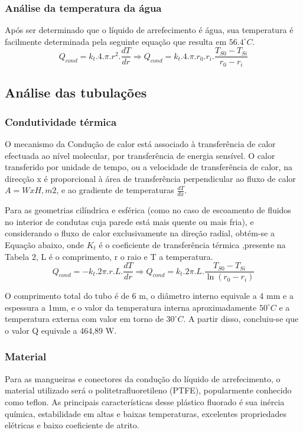\subsubsection{Análise da temperatura da água}
Após ser determinado que o líquido de arrefecimento é água, sua temperatura é facilmente determinada pela seguinte equação que resulta em $56.4^{\circ}C$.
$$ Q_{cond} = k_{t}.4.\pi.r^2.\frac{dT}{dr} \Longrightarrow Q_{cond} = k_{t}.4.\pi.r_{0}.r_{i}.\frac{T_{S0}-T_{Si}}{r_{0}-r_{i}}$$


\subsection{Análise das tubulações}

\subsubsection{Condutividade térmica}
O mecanismo da Condução de calor está associado à transferência de calor efectuada ao nível molecular, por transferência de energia sensível. O calor transferido por unidade de tempo, ou a velocidade de transferência de calor, na direcção x é proporcional à área de transferência perpendicular ao fluxo de calor $A=WxH, m2$, e ao gradiente de temperaturas $\frac{dT}{dx}$.

Para as geometrias cilíndrica e esférica (como no caso de escoamento de fluidos no interior de condutas cuja parede está mais quente ou mais fria), e considerando o fluxo de calor exclusivamente na direção radial, obtém-se a Equação abaixo, onde $K_{t}$ é o coeficiente de transferência térmica ,presente na Tabela 2, L é o comprimento, r o raio e T a temperatura.
$$ Q_{cond} = -k_{t}.2\pi.r.L.\frac{dT}{dr} \Longrightarrow Q_{cond} = k_{t}.2\pi.L.\frac{T_{S0}-T_{Si}}{\ln (r_{0}-r_{i})}$$

O comprimento total do tubo é de 6 m, o diâmetro interno equivale a 4 mm e a espessura a 1mm, e o valor da temperatura interna aproximadamente $50^{\circ}C$ e a temperatura externa com valor em torno de $30^{\circ}C$. A partir disso, concluiu-se que o valor Q equivale a 464,89 W.

\subsubsection{Material}
Para as mangueiras e conectores da condução do líquido de arrefecimento, o material utilizado será o politetrafluoretileno (PTFE), popularmente conhecido como teflon. As principais características desse plástico fluorado é sua inércia química, estabilidade em altas e baixas temperaturas, excelentes propriedades elétricas e baixo coeficiente de atrito.

